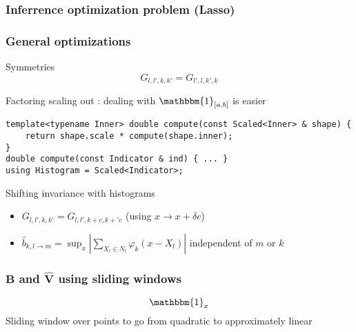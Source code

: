 \documentclass{beamer}
\newcommand\D{\mathrm{d}}
\newcommand\R{\mathbbm{R}}
\newcommand\Indicator[1]{\mathbbm{1}_{#1}}
\DeclareMathOperator*{\argmin}{arg\,min}
\begin{document}
\begin{frame}\frametitle{Inferrence optimization problem (Lasso)}
\end{frame}

\begin{frame}[fragile]\frametitle{General optimizations}
    Symmetries
    \[ G_{l,l',k,k'} = G_{l',l,k',k} \]
    
    Factoring scaling out : dealing with $\Indicator{[a,b]}$ is easier
    \begin{verbatim}
template<typename Inner> double compute(const Scaled<Inner> & shape) {
    return shape.scale * compute(shape.inner);
}
double compute(const Indicator & ind) { ... }
using Histogram = Scaled<Indicator>;
    \end{verbatim}
    
    Shifting invariance with histograms
    \begin{itemize}
        \item $G_{l,l',k,k'} = G_{l,l',k+c,k+'c}$ (using $x \rightarrow x + \delta c$)
        \item $\widehat{b}_{k,l \rightarrow m} = \sup_x \left|\sum_{X_l \in N_l} \varphi_k(x - X_l) \right|$ independent of $m$ or $k$
    \end{itemize}
\end{frame}

\begin{frame}\frametitle{$\bm{B}$ and $\widehat{\bm{V}}$ using sliding windows}
    \[ \Indicator{x} \]
    Sliding window over points to go from quadratic to approximately linear
\end{frame}

\end{document}
